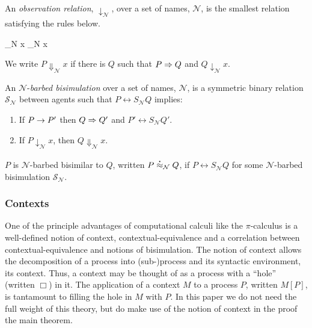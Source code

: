\begin{definition}
An \emph{observation relation}, $\downarrow_{\mathcal N}$, over a set
of names, $\mathcal N$, is the smallest relation satisfying the rules
below.

		  { \downarrow_{\mathcal N} x}
		  { \downarrow_{\mathcal N} x}

We write $P \Downarrow_{\mathcal N} x$ if there is $Q$ such that 
$P \Rightarrow Q$ and $Q \downarrow_{\mathcal N} x$.
\end{definition}

\begin{definition}
An  ${\mathcal N}$-\emph{barbed bisimulation} over a set of names, ${\mathcal N}$, is a symmetric binary relation 
${\mathcal S}_{\mathcal N}$ between agents such that $P\rel{S}_{\mathcal N}Q$ implies:
\begin{enumerate}
\item If $P \rightarrow P'$ then $Q \Rightarrow Q'$ and $P'\rel{S}_{\mathcal N} Q'$.
\item If $P\downarrow_{\mathcal N} x$, then $Q\Downarrow_{\mathcal N} x$.
\end{enumerate}
$P$ is ${\mathcal N}$-barbed bisimilar to $Q$, written
$P \stackrel{\centerdot}{\approx}_{\mathcal N} Q$, if $P \rel{S}_{\mathcal N} Q$ for some ${\mathcal N}$-barbed bisimulation ${\mathcal S}_{\mathcal N}$.
\end{definition}

\subsubsection{Contexts}

One of the principle advantages of computational calculi like the
$\pi$-calculus is a well-defined notion of context,
contextual-equivalence and a correlation between
contextual-equivalence and notions of bisimulation. The notion of
context allows the decomposition of a process into (sub-)process and
its syntactic environment, its context. Thus, a context may be
thought of as a process with a ``hole'' (written $\Box$) in it. The
application of a context $M$ to a process $P$, written $M[P]$, is
tantamount to filling the hole in $M$ with $P$. In this paper we do
not need the full weight of this theory, but do make use of the notion
of context in the proof the main theorem. 


